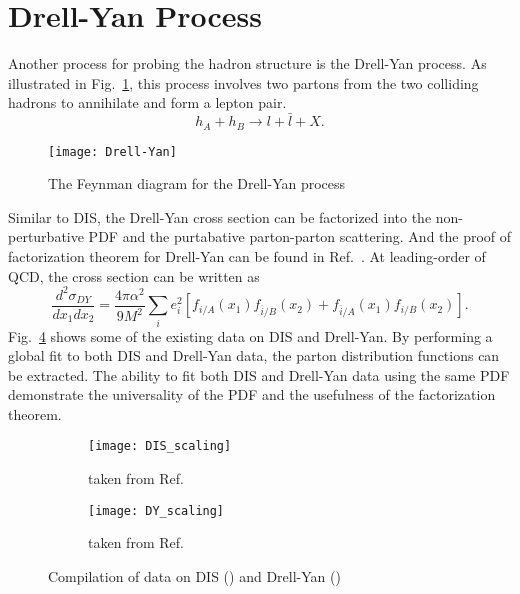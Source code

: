 \section{Drell-Yan Process}
\label{sec:DY}
Another process for probing the hadron structure is the Drell-Yan process\cite{drell1970}.
As illustrated in Fig.\ \ref{fig:DY}, this process involves two partons from the 
two colliding hadrons to annihilate and form a lepton pair.
\begin{equation}
	h_A + h_B \rightarrow l + \bar{l} + X.
\end{equation}
\begin{figure}[htbp!]
	\centering
	\texttt{[image: Drell-Yan]}
    \caption{The Feynman diagram for the Drell-Yan process}
    \label{fig:DY}
\end{figure}
Similar to DIS, the Drell-Yan cross section can be factorized into the non-perturbative
PDF and the purtabative parton-parton scattering. And the proof of factorization 
theorem for Drell-Yan can be found in Ref.\ \cite{collins1989}. At leading-order 
of QCD, the cross section can be written as
\begin{equation}
	\frac{d^2\sigma_{DY}}{dx_{1}dx_{2}} = \frac{4\pi\alpha^2}{9M^2}\sum_i e^2_i
		\left[f_{i/A}\left(x_1\right)f_{\bar{i}/B}\left(x_2\right) +
			f_{\bar{i}/A}\left(x_1\right)f_{i/B}\left(x_2\right)
		\right].
	\label{eq:DY_cs}
\end{equation}
Fig.\ \ref{fig:scaling} shows some of the existing data on DIS and Drell-Yan. By
performing a global fit to both DIS and Drell-Yan data, the parton distribution 
functions can be extracted. The ability to fit both DIS and Drell-Yan data using 
the same PDF demonstrate the universality of the PDF and the usefulness of the 
factorization theorem. 
\begin{figure}[htbp!]
	\centering
	\begin{subfigure}{0.45\linewidth}
		\texttt{[image: DIS\_scaling]}
		\caption{taken from Ref.\ \cite{theh1collaboration2003}}
		\label{subfig:DIS_scaling}
	\end{subfigure}
	\begin{subfigure}{0.45\linewidth}
		\texttt{[image: DY\_scaling]}
		\caption{taken from Ref.\ \cite{mcgaughey1999}}
		\label{subfig:DY_scaling}
	\end{subfigure}
	\caption{Compilation of data on DIS () and 
		Drell-Yan ()}
	\label{fig:scaling}
\end{figure}

